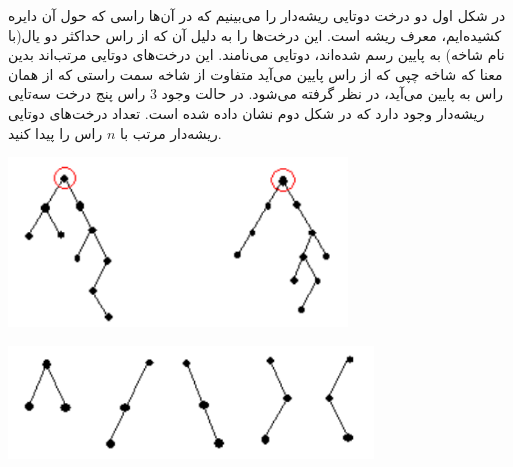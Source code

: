 \EXERCISE
در شکل اول دو درخت دوتایی ریشه‌دار را می‌بینیم که در آن‌ها راسی که حول آن دایره کشیده‌ایم، معرف ریشه است. این درخت‌ها را به دلیل آن که از راس حداکثر دو یال(با نام شاخه) به پایین رسم شده‌اند، دوتایی می‌نامند. این درخت‌های دوتایی مرتب‌اند بدین معنا که شاخه چپی که از راس پایین می‌آید متفاوت از شاخه سمت راستی که از همان راس به پایین می‌آید، در نظر گرفته می‌شود. در حالت وجود
$3$
راس پنج درخت سه‌تایی ریشه‌دار وجود دارد که در شکل دوم نشان داده شده است. تعداد درخت‌های دوتایی ریشه‌دار مرتب با
$n$
راس را پیدا کنید.
\begin{center}
\includegraphics[height=4.5cm]{19.png}
\end{center}
\p
\begin{center}
\includegraphics[height=3cm]{20.png}
\end{center}